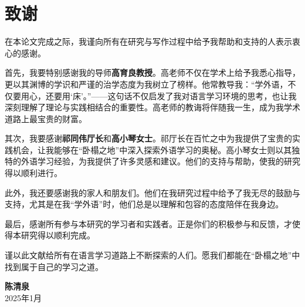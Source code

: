 \section*{致谢}

在本论文完成之际，我谨向所有在研究与写作过程中给予我帮助和支持的人表示衷心的感谢。

首先，我要特别感谢我的导师\textbf{高育良教授}。高老师不仅在学术上给予我悉心指导，更以其渊博的学识和严谨的治学态度为我树立了榜样。他常教导我：“学外语，不仅要用心，还要用‘床’。”——这句话不仅启发了我对语言学习环境的思考，也让我深刻理解了理论与实践相结合的重要性。高老师的教诲将伴随我一生，成为我学术道路上最宝贵的财富。

其次，我要感谢\textbf{祁同伟厅长}和\textbf{高小琴女士}。祁厅长在百忙之中为我提供了宝贵的实践机会，让我能够在“卧榻之地”中深入探索外语学习的奥秘。高小琴女士则以其独特的外语学习经验，为我提供了许多灵感和建议。他们的支持与帮助，使我的研究得以顺利进行。

此外，我还要感谢我的家人和朋友们。他们在我研究过程中给予了我无尽的鼓励与支持，尤其是在我“学外语”时，他们总是以理解和包容的态度陪伴在我身边。

最后，感谢所有参与本研究的学习者和实践者。正是你们的积极参与和反馈，才使得本研究得以顺利完成。

谨以此文献给所有在语言学习道路上不断探索的人们。愿我们都能在“卧榻之地”中找到属于自己的学习之道。

\begin{flushright}
\textbf{陈清泉} \\
2025年1月 
\end{flushright}